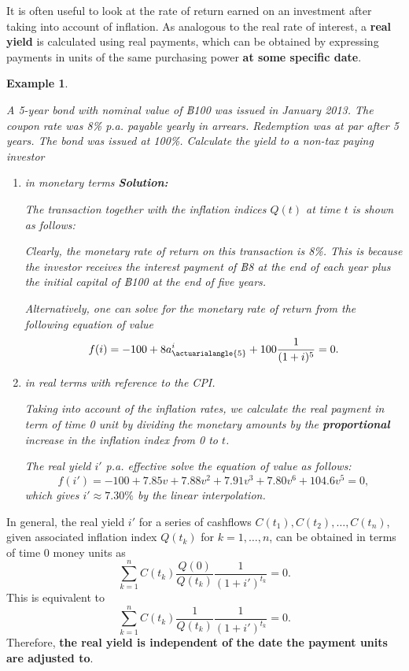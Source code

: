 \documentclass[landscape, 20pt]{extreport}
\theoremstyle{definition}
\theoremstyle{definition}
\newtheorem{example}{Example}[chapter]
\theoremstyle{definition}
\theoremstyle{definition}
\theoremstyle{remark}
\begin{document}
It is often useful to look at the rate of return earned on an investment
after taking into account of inflation. As analogous to the real rate of
interest, a \textbf{real yield} is calculated using real payments, which can
be obtained by expressing payments in units of the same purchasing power
\textbf{at some specific date}.

\newpage \begin{example}
\protect\hypertarget{exm:unlabeled-div-55}{}\label{exm:unlabeled-div-55}

\emph{A 5-year bond with nominal value of ฿100 was issued
in January 2013. The coupon rate was 8\% p.a. payable yearly in arrears.
Redemption was at par after 5 years. The bond was issued at 100\%.
Calculate the yield to a non-tax paying investor}

\begin{enumerate}
\def\labelenumi{\arabic{enumi}.}
\item
  \emph{in monetary terms \textbf{Solution:}}

  \emph{The transaction together with the inflation indices \(Q(t)\) at time
  \(t\) is shown as follows:}

  \emph{Clearly, the monetary rate of return on this transaction is 8\%.
  This is because the investor receives the interest payment of ฿8 at
  the end of each year plus the initial capital of ฿100 at the end of
  five years.}

  \emph{Alternatively, one can solve for the monetary rate of return from
  the following equation of value
  \[f(i) = -100 + 8 a^i_{\actuarialangle{5}} + 100\frac{1}{(1+i)^5} = 0.\]}
\item
  \emph{in real terms with reference to the CPI.}

  \emph{Taking into account of the inflation rates, we calculate the real
  payment in term of time 0 unit by dividing the monetary amounts by
  the \textbf{proportional} increase in the inflation index from 0 to \(t\).}

  \emph{The real yield \(i'\) p.a. effective solve the equation of value as
  follows:
  \[f(i') = -100 + 7.85 v  + 7.88v^2 + 7.91v^3 + 7.80v^6 + 104.6v^5 = 0,\]
  which gives \(i' \approx 7.30\%\) by the linear interpolation.}
\end{enumerate}

\end{example}

In general, the real yield \(i'\) for a series of cashflows
\(C(t_1), C(t_2), \ldots, C(t_n)\), given associated inflation index
\(Q(t_k)\) for \(k = 1, \ldots, n\), can be obtained in terms of time 0
money units as
\[\sum_{k=1}^n C(t_k) \frac{Q(0)}{Q(t_k)} \frac{1}{(1 + i')^{t_k}} = 0.\]
This is equivalent to
\[\sum_{k=1}^n C(t_k) \frac{1}{Q(t_k)} \frac{1}{(1 + i')^{t_k}} = 0.\]
Therefore, \textbf{the real yield is independent of the date the payment units
are adjusted to}.
\end{document}
